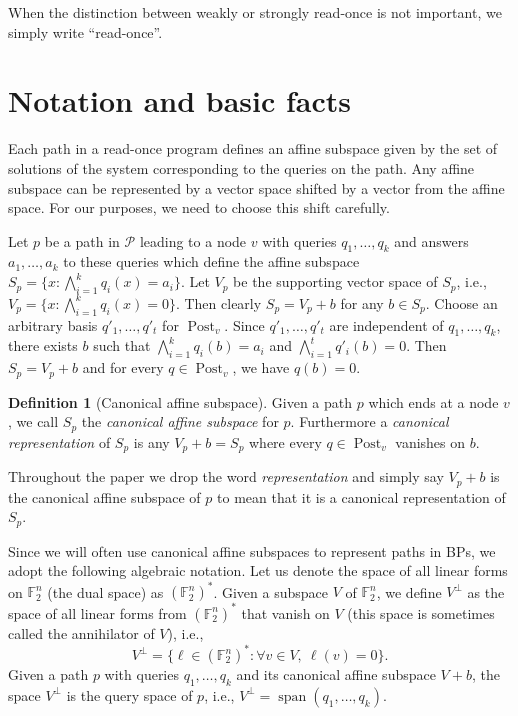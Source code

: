 \documentclass[10pt,a4paper]{article}
\theoremstyle{definition}
\newtheorem{definition}[theorem]{Definition}
\theoremstyle{remark}
\DeclareMathOperator{\Span}{span}
\DeclareMathOperator{\post}{Post}
\newcommand{\dual}[1]{{#1}^{*}}
\newcommand{\orth}[1]{{#1}^{\perp}}
\newcommand{\bbF}{\mathbb{F}}
\newcommand{\calP}{\mathcal{P}}
\newcommand{\readonce}{read-once}
\begin{document}
When the distinction between weakly or strongly read-once is not important, we simply write ``read-once''.



\section{Notation and basic facts}

Each path in a \readonce{} program defines an affine subspace given by the set of solutions of the system corresponding to the queries on the path. Any affine subspace can be represented by a vector space shifted by a vector from the affine space. For our purposes, we need to choose this shift carefully. 

Let $p$ be a path in $\calP$ leading to a node $v$ with queries $q_1, \ldots, q_k$ and answers $a_1, \ldots, a_k$ to these queries which define the affine subspace $S_p = \{x:\bigwedge_{i=1}^k q_i(x) = a_i\}$. Let $V_p$ be the supporting vector space of $S_p$, i.e., $V_p = \{x : \bigwedge_{i = 1}^k q_i(x) = 0\}$. Then clearly $S_p = V_p + b$ for any $b \in S_p$. Choose an arbitrary basis $q'_1, \ldots, q'_t$ for $\post_v$. Since $q'_1, \ldots, q'_t$ are independent of $q_1, \ldots, q_k$, there exists $b$ such that $\bigwedge_{i=1}^k q_i(b) = a_i$ and $\bigwedge_{i = 1}^t q'_i(b) = 0$. Then $S_p = V_p + b$ and for every $q \in \post_v$, we have $q(b) = 0$.

\begin{definition}[Canonical affine subspace] 
Given a path $p$ which ends at a node $v$, we call $S_p$ the \emph{canonical affine subspace} for $p$. Furthermore a \emph{canonical representation} of $S_p$ is any $V_p + b = S_p$ where every $q \in \post_v$ vanishes on $b$.
%
\end{definition}

Throughout the paper we drop the word \emph{representation} and simply say $V_p + b$ is the canonical affine subspace of $p$
 to mean that it is a canonical representation of $S_p$.
%

Since we will often use canonical affine subspaces to represent paths in BPs, we adopt the following algebraic notation.
Let us denote the space of all linear forms on $\bbF_2^n$ (the dual space) as $\dual{(\bbF_2^n)}$.
Given a subspace $V$ of $\bbF_2^n$, we define $\orth{V}$ as the space of all linear forms from $\dual{(\bbF_2^n)}$ that vanish on $V$ (this space is sometimes called the annihilator of $V$), i.e.,
\[
  \orth{V} = \{\ell \in \dual{(\bbF_2^n)} : \forall v \in V,\ \ell(v) = 0\}.
\]
Given a path $p$ with queries $q_1, \ldots, q_k$ and its canonical affine subspace $V+b$, the space $\orth{V}$ is the query space of $p$, i.e., $\orth{V} = \Span(q_1, \ldots, q_k)$.
\end{document}

